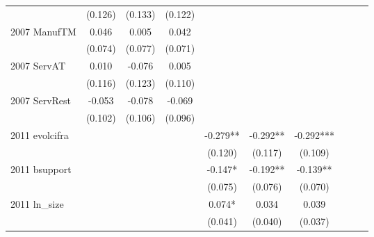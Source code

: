 \begin{table}[htbp]
\begin{tabular}{l*{9}{c}}
                    &     (0.126)   &     (0.133)   &     (0.122)   &               &               &               &               &               &               \\
2007 ManufTM        &       0.046   &       0.005   &       0.042   &               &               &               &               &               &               \\
                    &     (0.074)   &     (0.077)   &     (0.071)   &               &               &               &               &               &               \\
2007 ServAT         &       0.010   &      -0.076   &       0.005   &               &               &               &               &               &               \\
                    &     (0.116)   &     (0.123)   &     (0.110)   &               &               &               &               &               &               \\
2007 ServRest       &      -0.053   &      -0.078   &      -0.069   &               &               &               &               &               &               \\
                    &     (0.102)   &     (0.106)   &     (0.096)   &               &               &               &               &               &               \\
2011 evolcifra      &               &               &               &      -0.279** &      -0.292** &      -0.292***&               &               &               \\
                    &               &               &               &     (0.120)   &     (0.117)   &     (0.109)   &               &               &               \\
2011 bsupport       &               &               &               &      -0.147*  &      -0.192** &      -0.139** &               &               &               \\
                    &               &               &               &     (0.075)   &     (0.076)   &     (0.070)   &               &               &               \\
2011 ln\_size        &               &               &               &       0.074*  &       0.034   &       0.039   &               &               &               \\
                    &               &               &               &     (0.041)   &     (0.040)   &     (0.037)   &               &               &               \\

\end{tabular}
\end{table}
